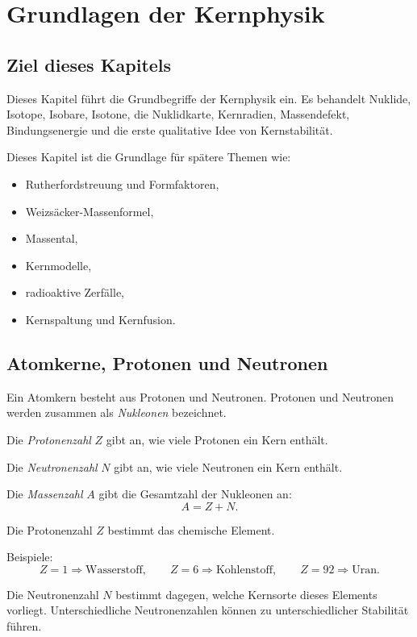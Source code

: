 \chapter{Grundlagen der Kernphysik}

\section{Ziel dieses Kapitels}

Dieses Kapitel führt die Grundbegriffe der Kernphysik ein.
Es behandelt Nuklide, Isotope, Isobare, Isotone, die Nuklidkarte, Kernradien,
Massendefekt, Bindungsenergie und die erste qualitative Idee von Kernstabilität.

\begin{notebox}
Dieses Kapitel ist die Grundlage für spätere Themen wie:
\begin{itemize}
    \item Rutherfordstreuung und Formfaktoren,
    \item Weizsäcker-Massenformel,
    \item Massental,
    \item Kernmodelle,
    \item radioaktive Zerfälle,
    \item Kernspaltung und Kernfusion.
\end{itemize}
\end{notebox}

\section{Atomkerne, Protonen und Neutronen}

Ein Atomkern besteht aus Protonen und Neutronen.
Protonen und Neutronen werden zusammen als \emph{Nukleonen} bezeichnet.

\begin{definitionbox}
Die \emph{Protonenzahl} $Z$ gibt an, wie viele Protonen ein Kern enthält.

Die \emph{Neutronenzahl} $N$ gibt an, wie viele Neutronen ein Kern enthält.

Die \emph{Massenzahl} $A$ gibt die Gesamtzahl der Nukleonen an:
\[
    A = Z + N.
\]
\end{definitionbox}

\begin{conceptbox}
Die Protonenzahl $Z$ bestimmt das chemische Element.

Beispiele:
\[
    Z=1 \Rightarrow \text{Wasserstoff},
    \qquad
    Z=6 \Rightarrow \text{Kohlenstoff},
    \qquad
    Z=92 \Rightarrow \text{Uran}.
\]

Die Neutronenzahl $N$ bestimmt dagegen, welche Kernsorte dieses Elements vorliegt.
Unterschiedliche Neutronenzahlen können zu unterschiedlicher Stabilität führen.
\end{conceptbox}

